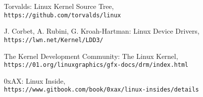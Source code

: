 \documentclass[a4paper,oneside,onecolumn]{article}
\begin{document}
\begin{thebibliography}{9}
Torvalds: Linux Kernel Source Tree,
\\\texttt{https://github.com/torvalds/linux}

J. Corbet, A. Rubini, G. Kroah-Hartman: Linux Device Drivers,
\\\texttt{https://lwn.net/Kernel/LDD3/}

The Kernel Development Community: The Linux Kernel,
\\\texttt{https://01.org/linuxgraphics/gfx-docs/drm/index.html}

0xAX: Linux Inside,
\\\texttt{https://www.gitbook.com/book/0xax/linux-insides/details}
\end{thebibliography}
\end{document}

